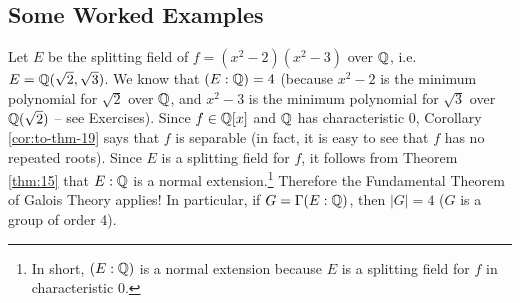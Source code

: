 \subsection{Some Worked Examples}
\begin{example}
	Let $E$ be the splitting field of $f = (x^2 - 2)(x^2 - 3)$ over $\mathbb{Q}$, i.e. $E = \mathbb{Q}(\sqrt{2}, \sqrt{3})$. We know that $(E : \mathbb{Q}) = 4$ (because $x^2 - 2$ is the minimum polynomial for $\sqrt{2}$ over $\mathbb{Q}$, and $x^2 - 3$ is the minimum polynomial for $\sqrt{3}$ over $\mathbb{Q}(\sqrt{2})$ -- see Exercises). Since $f \in \mathbb{Q}[x]$ and $\mathbb{Q}$ has characteristic 0, Corollary \ref{cor:to-thm-19} says that $f$ is separable (in fact, it is easy to see that $f$ has no repeated roots). Since $E$ is a splitting field for $f$, it follows from Theorem \ref{thm:15} that $E : \mathbb{Q}$ is a normal extension.\footnote{In short, $(E : \mathbb{Q})$ is a normal extension because $E$ is a splitting field for $f$ in characteristic 0.} Therefore the Fundamental Theorem of Galois Theory applies! In particular, if $G = \Gamma(E : \mathbb{Q})$, then $|G| = 4$ ($G$ is a group of order 4).
	

\end{example}
